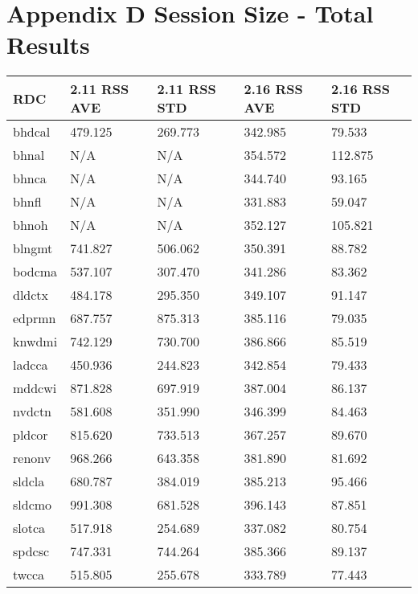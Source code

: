 \documentclass{article}
\begin{document}
\newpage



\appendix

\section{Appendix D\: Session Size - Total Results}
\label{APPENDIX-SessionSizeTotals}








\begin{table}[H]
\begin{tabular}{|l|l|l|l|l|}
\hline RDC & 2.11 RSS AVE & 2.11 RSS STD & 2.16 RSS AVE & 2.16 RSS STD \\
\hline bhdcal & 479.125 & 269.773 & 342.985 & 79.533 \\
\hline bhnal & N/A & N/A & 354.572 & 112.875 \\
\hline bhnca & N/A & N/A & 344.740 & 93.165 \\
\hline bhnfl & N/A & N/A & 331.883 & 59.047 \\
\hline bhnoh & N/A & N/A & 352.127 & 105.821 \\
\hline blngmt & 741.827 & 506.062 & 350.391 & 88.782 \\
\hline bodcma & 537.107 & 307.470 & 341.286 & 83.362 \\
\hline dldctx & 484.178 & 295.350 & 349.107 & 91.147 \\
\hline edprmn & 687.757 & 875.313 & 385.116 & 79.035 \\
\hline knwdmi & 742.129 & 730.700 & 386.866 & 85.519 \\
\hline ladcca & 450.936 & 244.823 & 342.854 & 79.433 \\
\hline mddcwi & 871.828 & 697.919 & 387.004 & 86.137 \\
\hline nvdctn & 581.608 & 351.990 & 346.399 & 84.463 \\
\hline pldcor & 815.620 & 733.513 & 367.257 & 89.670 \\
\hline renonv & 968.266 & 643.358 & 381.890 & 81.692 \\
\hline sldcla & 680.787 & 384.019 & 385.213 & 95.466 \\
\hline sldcmo & 991.308 & 681.528 & 396.143 & 87.851 \\
\hline slotca & 517.918 & 254.689 & 337.082 & 80.754 \\
\hline spdcsc & 747.331 & 744.264 & 385.366 & 89.137 \\
\hline twcca & 515.805 & 255.678 & 333.789 & 77.443 \\

\end{tabular}
\end{table}
\end{document}
